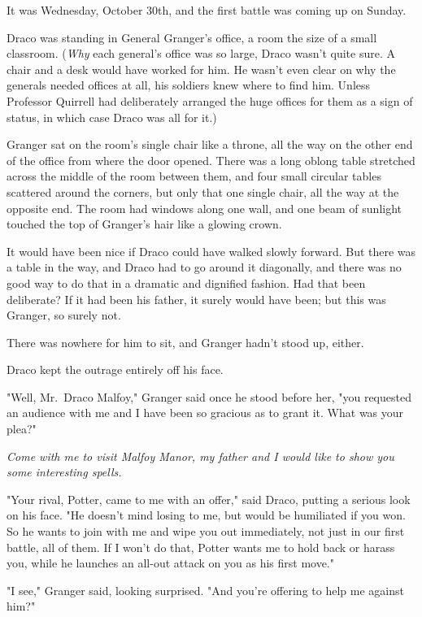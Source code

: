 It was Wednesday, October 30th, and the first battle was coming up on Sunday.

Draco was standing in General Granger's office, a room the size of a small 
classroom. (\emph{Why} each general's office was so large, Draco wasn't quite 
sure. A chair and a desk would have worked for him. He wasn't even clear on why 
the generals needed offices at all, his soldiers knew where to find him. Unless 
Professor Quirrell had deliberately arranged the huge offices for them as a 
sign of status, in which case Draco was all for it.)

Granger sat on the room's single chair like a throne, all the way on the other 
end of the office from where the door opened. There was a long oblong table 
stretched across the middle of the room between them, and four small circular 
tables scattered around the corners, but only that one single chair, all the 
way at the opposite end. The room had windows along one wall, and one beam of 
sunlight touched the top of Granger's hair like a glowing crown.

It would have been nice if Draco could have walked slowly forward. But there 
was a table in the way, and Draco had to go around it diagonally, and there was 
no good way to do that in a dramatic and dignified fashion. Had that been 
deliberate? If it had been his father, it surely would have been; but this was 
Granger, so surely not.

There was nowhere for him to sit, and Granger hadn't stood up, either.

Draco kept the outrage entirely off his face.

"Well, Mr.~Draco Malfoy," Granger said once he stood before her, "you requested 
an audience with me and I have been so gracious as to grant it. What was your 
plea?"

\emph{Come with me to visit Malfoy Manor, my father and I would like to show 
you some interesting spells.}

"Your rival, Potter, came to me with an offer," said Draco, putting a serious 
look on his face. "He doesn't mind losing to me, but would be humiliated if you 
won. So he wants to join with me and wipe you out immediately, not just in our 
first battle, all of them. If I won't do that, Potter wants me to hold back or 
harass you, while he launches an all-out attack on you as his first move."

"I see," Granger said, looking surprised. "And you're offering to help me 
against him?"

